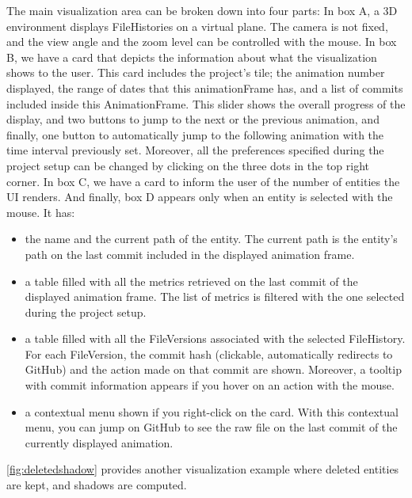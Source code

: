 The main visualization area can be broken down into four parts: 
In box A, a 3D environment displays FileHistories on a virtual plane. The camera is not fixed, and the view angle and the zoom level can be controlled with the mouse. 
In box B, we have a card that depicts the information about what the visualization shows to the user. 
This card includes the project's tile; the animation number displayed, the range of dates that this animationFrame has, and a list of commits included inside this AnimationFrame. This slider shows the overall progress of the display, and two buttons to jump to the next or the previous animation, and finally, one button to automatically jump to the following animation with the time interval previously set. 
Moreover, all the preferences specified during the project setup can be changed by clicking on the three dots in the top right corner.
In box C, we have a card to inform the user of the number of entities the UI renders. 
And finally, box D appears only when an entity is selected with the mouse. 
It has: 
\begin{itemize}
    \item the name and the current path of the entity. The current path is the entity's path on the last commit included in the displayed animation frame. 
    \item a table filled with all the metrics retrieved on the last commit of the displayed animation frame. The list of metrics is filtered with the one selected during the project setup. 
    \item a table filled with all the FileVersions associated with the selected FileHistory. For each FileVersion, the commit hash (clickable, automatically redirects to GitHub) and the action made on that commit are shown. Moreover, a tooltip with commit information appears if you hover on an action with the mouse.
    \item a contextual menu shown if you right-click on the card. With this contextual menu, you can jump on GitHub to see the raw file on the last commit of the currently displayed animation. 
\end{itemize}

\autoref{fig:deletedshadow} provides another visualization example where deleted entities are kept, and shadows are computed. 

